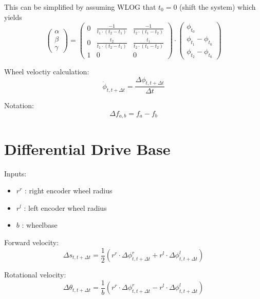\documentclass[a4paper]{article}
\begin{document}
This can be simplified by assuming WLOG that $t_0 = 0$ (shift the system) which yields
\begin{equation}
    \begin{pmatrix}
        \alpha \\
        \beta \\
        \gamma
    \end{pmatrix}
    =
    \begin{pmatrix}
        0 & \frac{ -1}{t_1 \cdot (t_2 - t_1)} & \frac{ -1}{t_2 \cdot (t_1 - t_2)} \\
        0 & \frac{t_2}{t_1 \cdot (t_2 - t_1)} & \frac{t_1}{t_2 \cdot (t_1 - t_2)} \\
        1 &                       0 &                       0
    \end{pmatrix}
    \cdot
    \begin{pmatrix}
        \phi_{t_0} \\
        \phi_{t_1} - \phi_{t_0} \\
        \phi_{t_2} - \phi_{t_0}
    \end{pmatrix}
\end{equation}

Wheel veloctiy calculation:
\begin{equation}
    \dot\phi_{t,t+\Delta t} = \frac{\Delta \phi_{t,t+\Delta t}}{\Delta t}
\end{equation}

Notation:
\begin{equation}
    \Delta f_{a,b} = f_a - f_b
\end{equation}


\section{Differential Drive Base}

Inputs:
\begin{itemize}
\item $r^r$ : right encoder wheel radius
\item $r^l$ : left encoder wheel radius
\item $b$ : wheelbase
\end{itemize}

Forward velocity:
\begin{equation}
    \Delta s_{t,t+\Delta t} = \frac{1}{2} (r^r \cdot \Delta \phi_{t,t+\Delta t}^r + r^l \cdot \Delta \phi_{t,t+\Delta t}^l)
\end{equation}

Rotational velocity:
\begin{equation}
    \Delta \theta_{t,t+\Delta t}  = \frac{1}{b} (r^r \cdot \Delta \phi_{t,t+\Delta t}^r - r^l \cdot \Delta \phi_{t,t+\Delta t}^l)
\end{equation}
\end{document}
